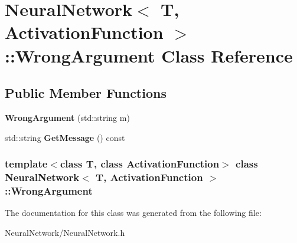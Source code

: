 \hypertarget{class_neural_network_1_1_wrong_argument}{\section{\-Neural\-Network$<$ \-T, \-Activation\-Function $>$\-:\-:\-Wrong\-Argument \-Class \-Reference}
\label{class_neural_network_1_1_wrong_argument}
}
\subsection*{\-Public \-Member \-Functions}
\begin{DoxyCompactItemize}
\item 
\hypertarget{class_neural_network_1_1_wrong_argument_a7dddcaf96b854ada5554b05e0429ea6a}{{\bfseries \-Wrong\-Argument} (std\-::string m)}\label{class_neural_network_1_1_wrong_argument_a7dddcaf96b854ada5554b05e0429ea6a}

\item 
\hypertarget{class_neural_network_1_1_wrong_argument_a708ad656cec99bc65e351dec562c5402}{std\-::string {\bfseries \-Get\-Message} () const }\label{class_neural_network_1_1_wrong_argument_a708ad656cec99bc65e351dec562c5402}

\end{DoxyCompactItemize}
\subsubsection*{template$<$class T, class Activation\-Function$>$ class Neural\-Network$<$ T, Activation\-Function $>$\-::\-Wrong\-Argument}



\-The documentation for this class was generated from the following file\-:\begin{DoxyCompactItemize}
\item 
\-Neural\-Network/\-Neural\-Network.\-h\end{DoxyCompactItemize}
